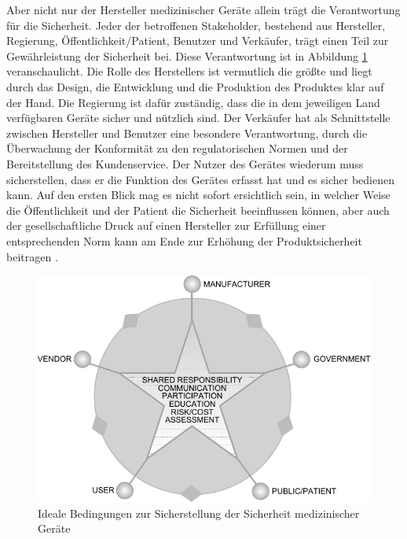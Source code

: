 \documentclass[a4paper,12pt]{report}
\begin{document}
Aber nicht nur der Hersteller medizinischer Geräte allein trägt die Verantwortung für die Sicherheit. Jeder der betroffenen Stakeholder, bestehend aus Hersteller, Regierung, Öffentlichkeit/Patient, Benutzer und Verkäufer, trägt einen Teil zur Gewährleistung der Sicherheit bei. Diese Verantwortung ist in Abbildung \ref{qs_shared_resp} veranschaulicht. Die Rolle des Herstellers ist vermutlich die größte und liegt durch das Design, die Entwicklung und die Produktion des Produktes klar auf der Hand. Die Regierung ist dafür zuständig, dass die in dem jeweiligen Land verfügbaren Geräte sicher und nützlich sind. Der Verkäufer hat als Schnittstelle zwischen Hersteller und Benutzer eine besondere Verantwortung, durch die Überwachung der Konformität zu den regulatorischen Normen und der Bereitstellung des Kundenservice. Der Nutzer des Gerätes wiederum muss sicherstellen, dass er die Funktion des Gerätes erfasst hat und es sicher bedienen kann. Auf den ersten Blick mag es nicht sofort ersichtlich sein, in welcher Weise die Öffentlichkeit und der Patient die Sicherheit beeinflussen können, aber auch der gesellschaftliche Druck auf einen Hersteller zur Erfüllung einer entsprechenden Norm kann am Ende zur Erhöhung der Produktsicherheit beitragen \citep[vgl.][S. 7f.]{Cheng2003}.
\begin{figure}[ht]
\centering
\includegraphics[width=1\textwidth]{Images/qs_shared_resp}
\caption[Ideale Bedingungen zur Sicherstellung der Sicherheit medizinischer Geräte]{Ideale Bedingungen zur Sicherstellung der Sicherheit medizinischer Geräte \citep[S. 8]{Cheng2003}}
\label{qs_shared_resp}
\end{figure}
\end{document}
